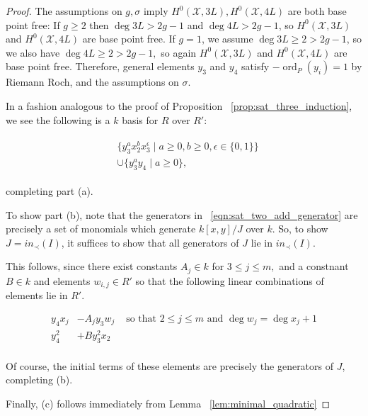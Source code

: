\documentclass{amsart}
\theoremstyle{plain}
\theoremstyle{definition}
\theoremstyle{remark}
\numberwithin{equation}{section}
\newcommand \sx{\mathscr X}
\DeclareMathOperator{\ord}{ord}
\begin{document}
\begin{proof}
The assumptions on $g,\sigma$ imply $H^0(\sx, 3L), H^0(\sx, 4L)$ are both base point free: If $g \geq 2$ then $\deg 3L > 2g-1$ and $\deg 4L > 2g-1$, so $H^0(\sx, 3L)$ and $H^0(\sx, 4L)$ are base point free. If $g = 1$, we assume $\deg 3L \geq 2 > 2g-1$, so we also have $\deg 4L \geq 2 > 2g -1,$ so again $H^0(\sx, 3L)$ and $H^0(\sx, 4L)$ are base point free. Therefore, general elements $y_3$ and $y_4$ satisfy $-\ord
_P(y_i) = 1$ by Riemann Roch, and the assumptions on $\sigma$.  

In a fashion analogous to the proof of Proposition 
~\ref{prop:sat_three_induction}, we see 
the following is a $k$ basis for $R$ over $R'$:

\begin{align}
\label{eqn:sat_two_add_generator}
	\begin{split}
		&\{ y_3^ax_2^b x_3^\epsilon \mid a \geq 0, b 
		\geq 0, \epsilon \in \{0, 1\}\} \\
		&\cup \{ y_3^ay_4 \mid a \geq 0 \},
	\end{split}
\end{align}

\noindent completing part (a).

To show part (b), note that the generators in
~\ref{eqn:sat_two_add_generator} are precisely a set of monomials which
generate $k[x,y]/J$ over $k$. So, to show $J = in_\prec(I)$, it
suffices to show that all generators of $J$ lie in $in_\prec(I)$.

This follows, since there exist constants $A_j \in k$ for $3 \leq j \leq m,$ and a constnant $B \in k$ and
elements $w_{i,j} \in R'$ so that the following linear combinations
of elements lie in $R'$.

\begin{align*}
	y_4x_j &- A_j y_3 w_j & \text{ so that } 2 \leq j \leq m \text{ and } \deg w_j = \deg x_j + 1\\
	y_4^2 &+ B y_3^2 x_2 \\
\end{align*}

\noindent
Of course, the initial terms of these elements are precisely the
generators of $J$, completing (b).

Finally, (c) follows immediately from Lemma ~\ref{lem:minimal_quadratic}
\end{proof}
\end{document}
